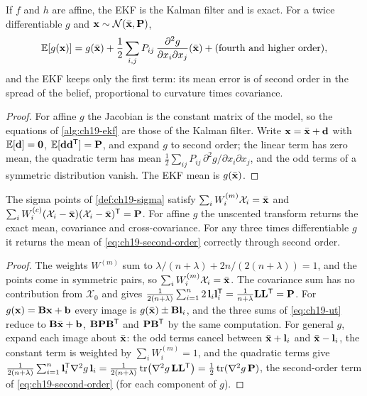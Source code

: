 \begin{proposition}
\label{thm:ch19-ekf-order}
If $f$ and $h$ are affine, the EKF is the Kalman filter and is exact. For a
twice differentiable $g$ and $\mathbf{x} \sim \mathcal{N}(\bar{\mathbf{x}}, \mathbf{P})$,
\begin{equation}
  \mathbb{E}[g(\mathbf{x})] = g(\bar{\mathbf{x}}) + \frac12 \sum_{i,j} P_{ij}\,
  \frac{\partial^2 g}{\partial x_i \partial x_j}(\bar{\mathbf{x}}) + \text{(fourth and higher order)},
  \label{eq:ch19-second-order}
\end{equation}
and the EKF keeps only the first term: its mean error is of second order in
the spread of the belief, proportional to curvature times covariance.
\end{proposition}
\begin{proof}
For affine $g$ the Jacobian is the constant matrix of the model, so the
equations of \cref{alg:ch19-ekf} are those of the Kalman filter. Write
$\mathbf{x} = \bar{\mathbf{x}} + \mathbf{d}$ with $\mathbb{E}[\mathbf{d}] = \mathbf{0}$,
$\mathbb{E}[\mathbf{d}\mathbf{d}^{\mathsf{T}}] = \mathbf{P}$, and expand $g$ to second order; the
linear term has zero mean, the quadratic term has mean $\frac12
\sum_{ij}P_{ij}\,\partial^2 g/\partial x_i\partial x_j$, and the odd terms
of a symmetric distribution vanish. The EKF mean is $g(\bar{\mathbf{x}})$.
\end{proof}

\begin{proposition}
\label{thm:ch19-ut}
The sigma points of \cref{def:ch19-sigma} satisfy $\sum_i W_i^{(m)}
\mathcal{X}_i = \bar{\mathbf{x}}$ and $\sum_i W_i^{(c)}(\mathcal{X}_i -
\bar{\mathbf{x}})(\mathcal{X}_i - \bar{\mathbf{x}})^{\mathsf{T}} = \mathbf{P}$. For affine $g$ the
unscented transform returns the exact mean, covariance and cross-covariance.
For any three times differentiable $g$ it returns the mean of
\cref{eq:ch19-second-order} correctly through second order.
\end{proposition}
\begin{proof}
The weights $W^{(m)}$ sum to $\lambda/(n+\lambda) + 2n/(2(n+\lambda)) = 1$,
and the points come in symmetric pairs, so $\sum_i W_i^{(m)}\mathcal{X}_i =
\bar{\mathbf{x}}$. The covariance sum has no contribution from $\mathcal{X}_0$
and gives $\frac{1}{2(n+\lambda)}\sum_{i=1}^n 2\,\mathbf{l}_i\mathbf{l}_i^{\mathsf{T}} =
\frac{1}{n+\lambda}\mathbf{L}\mathbf{L}^{\mathsf{T}} = \mathbf{P}$. For $g(\mathbf{x}) = \mathbf{B}
\mathbf{x} + \mathbf{b}$ every image is $g(\bar{\mathbf{x}}) \pm \mathbf{B}\mathbf{l}_i$,
and the three sums of \cref{eq:ch19-ut} reduce to $\mathbf{B}\bar{\mathbf{x}} +
\mathbf{b}$, $\mathbf{B}\mathbf{P}\mathbf{B}^{\mathsf{T}}$ and $\mathbf{P}\mathbf{B}^{\mathsf{T}}$ by the same
computation. For general $g$, expand each image about $\bar{\mathbf{x}}$: the
odd terms cancel between $\bar{\mathbf{x}} + \mathbf{l}_i$ and $\bar{\mathbf{x}} -
\mathbf{l}_i$, the constant term is weighted by $\sum_i W_i^{(m)} = 1$, and the
quadratic terms give $\frac{1}{2(n+\lambda)}\sum_{i=1}^n \mathbf{l}_i^{\mathsf{T}}
\nabla^2 g\,\mathbf{l}_i = \frac{1}{2(n+\lambda)}\operatorname{tr}\bigl(\nabla^2 g\,
\mathbf{L}\mathbf{L}^{\mathsf{T}}\bigr) = \frac12\operatorname{tr}(\nabla^2 g\,\mathbf{P})$, the second-order
term of \cref{eq:ch19-second-order} (for each component of $g$).
\end{proof}

